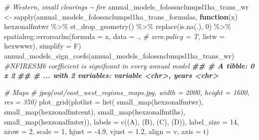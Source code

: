 \documentclass[10pt,landscape,a3paper]{article}
\newenvironment{Shaded}{\begin{snugshade}}{\end{snugshade}}
\newcommand{\AttributeTok}[1]{\textcolor[rgb]{0.77,0.63,0.00}{#1}}
\newcommand{\CommentTok}[1]{\textcolor[rgb]{0.56,0.35,0.01}{\textit{#1}}}
\newcommand{\ControlFlowTok}[1]{\textcolor[rgb]{0.13,0.29,0.53}{\textbf{#1}}}
\newcommand{\DecValTok}[1]{\textcolor[rgb]{0.00,0.00,0.81}{#1}}
\newcommand{\DocumentationTok}[1]{\textcolor[rgb]{0.56,0.35,0.01}{\textbf{\textit{#1}}}}
\newcommand{\FloatTok}[1]{\textcolor[rgb]{0.00,0.00,0.81}{#1}}
\newcommand{\FunctionTok}[1]{\textcolor[rgb]{0.00,0.00,0.00}{#1}}
\newcommand{\NormalTok}[1]{#1}
\newcommand{\OtherTok}[1]{\textcolor[rgb]{0.56,0.35,0.01}{#1}}
\newcommand{\SpecialCharTok}[1]{\textcolor[rgb]{0.00,0.00,0.00}{#1}}
\newcommand{\StringTok}[1]{\textcolor[rgb]{0.31,0.60,0.02}{#1}}
\begin{document}
\begin{Shaded}
\begin{Highlighting}[]
\CommentTok{\# Western, small clearings \textasciitilde{} fire}
\NormalTok{annual\_models\_folossnclumpsl1ha\_trans\_wr }\OtherTok{\textless{}{-}} \FunctionTok{sapply}\NormalTok{(annual\_models\_folossnclumpsl1ha\_trans\_formulas,}
                        \ControlFlowTok{function}\NormalTok{(x)}
\NormalTok{                          hexzonalfmtwr }\SpecialCharTok{\%\textgreater{}\%}
                          \FunctionTok{st\_drop\_geometry}\NormalTok{() }\SpecialCharTok{\%\textgreater{}\%}
                          \FunctionTok{replace}\NormalTok{(}\FunctionTok{is.na}\NormalTok{(.), }\DecValTok{0}\NormalTok{) }\SpecialCharTok{\%\textgreater{}\%}
\NormalTok{                          spatialreg}\SpecialCharTok{::}\FunctionTok{errorsarlm}\NormalTok{(}\AttributeTok{formula =}\NormalTok{ x,}
                                                 \AttributeTok{data =}\NormalTok{ ., }\CommentTok{\# zero.policy = T,}
                                                 \AttributeTok{listw =}\NormalTok{ hexwwwr),}
                        \AttributeTok{simplify =}\NormalTok{ F)}
\FunctionTok{annual\_models\_sign\_coefs}\NormalTok{(annual\_models\_folossnclumpsl1ha\_trans\_wr) }\CommentTok{\#NFIRESM6 coefficient is significant in every annual model}
\DocumentationTok{\#\# \# A tibble: 0 x 2}
\DocumentationTok{\#\# \# ... with 2 variables: variable \textless{}chr\textgreater{}, years \textless{}chr\textgreater{}}

\CommentTok{\# Maps}
\CommentTok{\# jpeg(\textquotesingle{}out/east\_west\_regions\_maps.jpg\textquotesingle{}, width = 2000, height = 1600, res = 350)}
\FunctionTok{plot\_grid}\NormalTok{(}\AttributeTok{plotlist =} \FunctionTok{list}\NormalTok{(}
  \FunctionTok{small\_map}\NormalTok{(hexzonalfmtwr),}
  \FunctionTok{small\_map}\NormalTok{(hexzonalfmtcent),}
  \FunctionTok{small\_map}\NormalTok{(hexzonalfmtlhs),}
  \FunctionTok{small\_map}\NormalTok{(hexzonalfmter)),}
  \AttributeTok{labels =} \FunctionTok{c}\NormalTok{(}\StringTok{\textquotesingle{}(A)\textquotesingle{}}\NormalTok{, }\StringTok{\textquotesingle{}(B)\textquotesingle{}}\NormalTok{, }\StringTok{\textquotesingle{}(C)\textquotesingle{}}\NormalTok{, }\StringTok{\textquotesingle{}(D)\textquotesingle{}}\NormalTok{),}
  \AttributeTok{label\_size =} \DecValTok{14}\NormalTok{, }\AttributeTok{nrow =} \DecValTok{2}\NormalTok{, }\AttributeTok{scale =} \DecValTok{1}\NormalTok{, }\AttributeTok{hjust =} \SpecialCharTok{{-}}\FloatTok{4.9}\NormalTok{, }\AttributeTok{vjust =} \FloatTok{1.2}\NormalTok{,}
  \AttributeTok{align =} \StringTok{\textquotesingle{}v\textquotesingle{}}\NormalTok{, }\AttributeTok{axis =} \StringTok{\textquotesingle{}t\textquotesingle{}}\NormalTok{)}
\end{Highlighting}
\end{Shaded}
\end{document}

